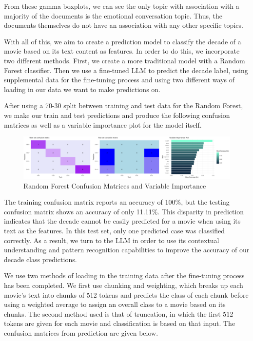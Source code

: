 \documentclass[
  authoryear,
  preprint]{elsarticle}
\begin{document}
From these gamma boxplots, we can see the only topic with association
with a majority of the documents is the emotional conversation topic.
Thus, the documents themselves do not have an association with any other
specific topics.

With all of this, we aim to create a prediction model to classify the
decade of a movie based on its text content as features. In order to do
this, we incorporate two different methods. First, we create a more
traditional model with a Random Forest classifier. Then we use a
fine-tuned LLM to predict the decade label, using supplemental data for
the fine-tuning process and using two different ways of loading in our
data we want to make predictions on.

After using a 70-30 split between training and test data for the Random
Forest, we make our train and test predictions and produce the following
confusion matrices as well as a variable importance plot for the model
itself.

\begin{figure}[H]

{\centering \includegraphics{images/rf_imp-imageonline.co-merged.png}

}

\caption{Random Forest Confusion Matrices and Variable Importance}

\end{figure}%

The training confusion matrix reports an accuracy of 100\%, but the
testing confusion matrix shows an accuracy of only 11.11\%. This
disparity in prediction indicates that the decade cannot be easily
predicted for a movie when using its text as the features. In this test
set, only one predicted case was classified correctly. As a result, we
turn to the LLM in order to use its contextual understanding and pattern
recognition capabilities to improve the accuracy of our decade class
predictions.~

We use two methods of loading in the training data after the fine-tuning
process has been completed. We first use chunking and weighting, which
breaks up each movie's text into chunks of 512 tokens and predicts the
class of each chunk before using a weighted average to assign an overall
class to a movie based on its chunks. The second method used is that of
truncation, in which the first 512 tokens are given for each movie and
classification is based on that input. The confusion matrices from
prediction are given below.
\end{document}
